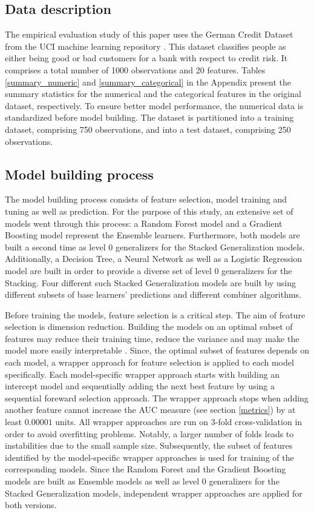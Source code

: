 \documentclass[12pt]{article}
\begin{document}
\subsection{Data description}
The empirical evaluation study of this paper uses the German Credit Dataset from the UCI machine learning repository \citep{dataset}. This dataset classifies people as either being good or bad customers for a bank with respect to credit risk. It comprises a total number of 1000 observations and 20 features. Tables \ref{summary_numeric} and \ref{summary_categorical} in the Appendix present the summary statistics for the numerical and the categorical features in the original dataset, respectively. To ensure better model performance, the numerical data is standardized before model building. The dataset is partitioned into a training dataset, comprising 750 observations, and into a test dataset, comprising 250 observations.





\subsection{Model building process}
The model building process consists of feature selection, model training and tuning as well as prediction. For the purpose of this study, an extensive set of models went through this process: a Random Forest model and a Gradient Boosting model represent the Ensemble learners. Furthermore, both models are built a second time as level 0 generalizers for the Stacked Generalization models. Additionally, a Decision Tree, a Neural Network as well as a Logistic Regression model are built in order to provide a diverse set of level 0 generalizers for the Stacking. Four different such Stacked Generalization models are built by using different subsets of base learners' predictions and different combiner algorithms. 

Before training the models, feature selection is a critical step. The aim of feature selection is dimension reduction. Building the models on an optimal subset of features may reduce their training time, reduce the variance and may make the model more easily interpretable \citep{guyon2003introduction}. Since, the optimal subset of features depends on each model, a wrapper approach for feature selection is applied to each model specifically. Each model-specific wrapper approach starts with building an intercept model and sequentially adding the next best feature by using a sequential foreward selection approach. The wrapper approach stops when adding another feature cannot increase the AUC measure (see section \ref{metrics}) by at least $0.00001$ units. All wrapper approaches are run on 3-fold cross-validation in order to avoid overfitting problems. Notably, a larger number of folds leads to instabilities due to the small sample size. Subsequently, the subset of features identified by the model-specific wrapper approaches is used for training of the corresponding models. Since the Random Forest and the Gradient Boosting models are built as Ensemble models as well as level 0 generalizers for the Stacked Generalization models, independent wrapper approaches are applied for both versions.
\end{document}
